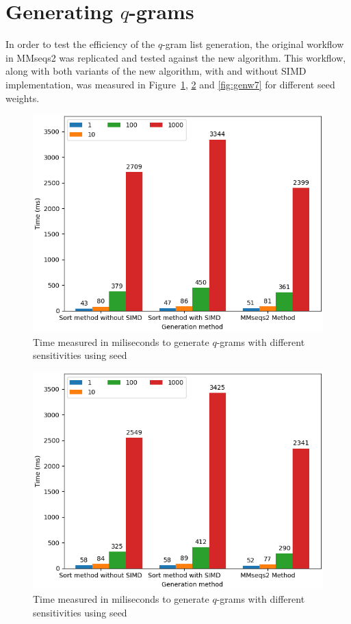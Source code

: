 \documentclass[twoside,a4paper,bsc]{master}
\newcommand{\Qgram}[1]{\(#1\)-gram}
\begin{document}
\section{Generating \Qgram{q}s}
In order to test the efficiency of the \Qgram{q} list generation, the
original workflow in MMseqs2 was replicated and tested against the new
algorithm. This workflow, along with both variants of the new algorithm,
with and without SIMD implementation, was measured in
Figure~\ref{fig:genw5}, \ref{fig:genw6} and \ref{fig:genw7} for different
seed weights.
\begin{figure}
\centering
\includegraphics[scale=0.6]{graphics/gen_w5.png}
\caption{Time measured in miliseconds to generate \Qgram{q}s with
different sensitivities using seed }
\label{fig:genw5}
\end{figure}
\begin{figure}
\centering
\includegraphics[scale=0.6]{graphics/gen_w6.png}
\caption{Time measured in miliseconds to generate \Qgram{q}s with
different sensitivities using seed }
\label{fig:genw6}
\end{figure}
\end{document}
